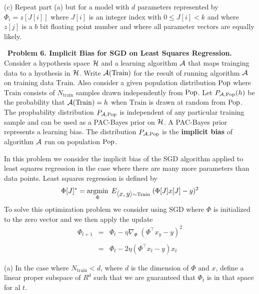 \medskip
(c) Repeat part (a) but for a model with $d$ parameters represented by
$\Phi_i = z[J[i]]$ where $J[i]$ is an integer index with $0 \leq J[i] < k$ and where $z[j]$ is a $b$ bit floating point number and where all parameter vectors are equally likely.


\medskip
~{\bf Problem 6. Implicit Bias for SGD on Least Squares Regression.}  Consider a hypothesis space ${\cal H}$ and a learning algorithm ${\cal A}$
that maps trainging data to a hyothesis in ${\cal H}$.  Write ${\cal A}(\mathrm{Train})$ for the result of running algorithm ${\cal A}$ on training data $\mathrm{Train}$.
Also consider a given population distribution $\mathrm{Pop}$ where $\mathrm{Train}$ consists of $N_{\mathrm{train}}$ samples drawn independently from $\mathrm{Pop}$.
Let $P_{{\cal A},\mathrm{Pop}}(h)$ be the probability that ${\cal A}(\mathrm{Train}) = h$
when $\mathrm{Train}$ is drawn at random from $\mathrm{Pop}$.  The propbability distribution $P_{{\cal A},\mathrm{Pop}}$ is independent of any particular training sample
and can be used as a PAC-Bayes prior on ${\cal H}$. A PAC-Bayes prior represents a learning bias.
The distribution $P_{{\cal A},\mathrm{Pop}}$ is the {\bf implicit bias} of algorithm ${\cal A}$ run on population $\mathrm{Pop}$.

\medskip
In this problem we consider the implicit bias of the SGD algorithm applied to least squares regression in the case where there are many more parameters than data points.
Least squares regression is defined by
$$\Phi[J]^* = \operatorname*{argmin}_\Phi \; E_{{\mbox{$\langle x,y\rangle$}} \sim \mathrm{Train}}\;(\Phi[J]x[J] - y)^2$$
To solve this optimization problem we consider using SGD where $\Phi$ is initialized to the zero vector and we then apply the update
\begin{eqnarray*}
  \Phi_{t+1} & = & \Phi_t - \eta \nabla_\Phi\;(\Phi^\top x_y - y)^2 \\
  \\
  & = & \Phi_t - 2 \eta (\Phi^\top x_t - y)x_t
\end{eqnarray*}

\medskip
(a) In the case where $N_{\mathrm{train}} < d$, where $d$ is the dimension of $\Phi$ and $x$, define a linear proper subspace of $R^d$ such that we are guaranteed
that $\Phi_t$ is in that space for al $t$.

